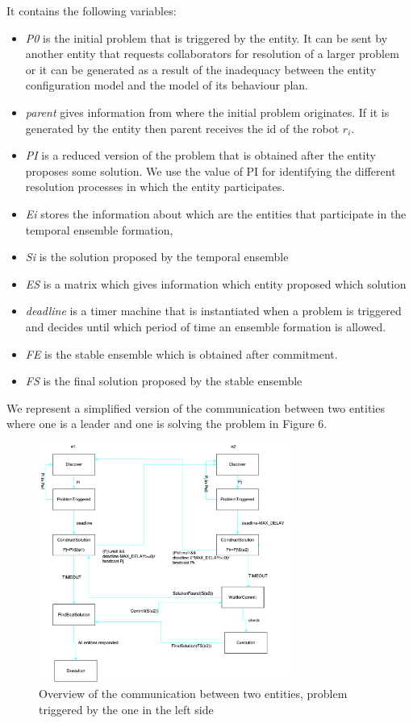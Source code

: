 \documentclass[journal]{IEEEtran}
\theoremstyle{definition}
\begin{document}
It contains the following variables:
\begin{itemize}
\item \textit{P0} is the initial problem that is triggered by the entity. It can be sent by another entity that requests collaborators for resolution of a larger problem or 
it can be generated as a result of the inadequacy between the entity configuration model and the model of its behaviour plan.
\item \textit{parent} gives information from where the initial problem originates. If it is generated by the entity then parent receives the id of the robot $r_i$.
\item \textit{PI} is a reduced version of the problem that is obtained after the entity proposes some solution. We use the value of PI for identifying the different resolution processes in which the entity participates.
\item \textit{Ei} stores the information about which are the entities that participate in the temporal ensemble formation, 
\item \textit{Si} is the solution proposed by the temporal ensemble 
\item \textit{ES} is a matrix which gives information which entity proposed which solution
\item \textit{deadline} is a timer machine that is instantiated when a problem is triggered and decides until which period of time an ensemble formation is allowed.
\item \textit{FE} is the stable ensemble which is obtained after commitment.
\item \textit{FS} is the final solution proposed by the stable ensemble
\end{itemize}
We represent a simplified version of the communication between two entities where one is a leader and one is solving the problem in Figure 6.

\begin{figure}[h]
\includegraphics[width=3.25in]{Figures/MissionResolution_SD.pdf}
\caption{Overview of the communication between two entities, problem triggered by the one in the left side}
\end{figure}
\end{document}

